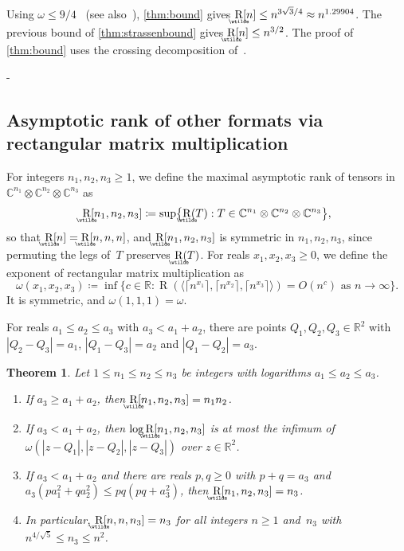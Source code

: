\documentclass[11pt,letterpaper]{article}
\makeatletter
\numberwithin{equation}{section}
\newcommand{\reservelines}[1]{\par\penalty\z@\dimen@\pagegoal\advance\dimen@-\pagetotal
 \ifdim\dimen@<#1\baselineskip\ifdim\dimen@>\z@\vfil\fi\break\fi}
\let\plainsubsection\subsection
\renewcommand{\subsection}{\reservelines{7}\plainsubsection}
\newtheorem{theorem}{Theorem}[section]
\theoremstyle{definition}
\DeclareMathOperator{\tensorrank}{R}
\DeclareMathOperator{\asymprank}{\underaccent{\wtilde}{R}}
\newcommand{\CC}{\mathbb{C}}
\newcommand{\RR}{\mathbb{R}}
\makeatother
\begin{document}
Using $\omega\le9/4$~\cite[Theorem~1.1]{OAI:Matrix-Multiplication-Nine-Fourths-October-2-2026} (see
also~\cite{amanov2026multiplyingmatricespolynomialsexposition,dogan2026tensorvalue,li2026semidirect,shpilka2026exposition}), \cref{thm:bound} gives $\asymprank[n]\le n^{3\sqrt3/4}\approx n^{1.29904}$. The previous bound of \cref{thm:strassenbound}
gives $\asymprank[n]\le n^{3/2}$. The proof of \cref{thm:bound} uses the crossing decomposition
of~\cite{claude2026threeSAT,khoruzhii2026crossing}.

\subsection{Asymptotic rank of other formats via rectangular matrix multiplication}\label{sec:intro-formats}

For integers $n_1,n_2,n_3\ge1$, we define the maximal asymptotic rank of tensors in
$\CC^{n_1}\otimes\CC^{n_2}\otimes\CC^{n_3}$ as
\[
\asymprank[n_1,n_2,n_3]\coloneqq\sup\bigl\{\asymprank(T):T\in\CC^{n_1}\otimes\CC^{n_2}\otimes\CC^{n_3}\bigr\},
\]
so that $\asymprank[n]=\asymprank[n,n,n]$, and $\asymprank[n_1,n_2,n_3]$ is symmetric in $n_1,n_2,n_3$, since permuting the legs of~$T$ preserves $\asymprank(T)$. For reals $x_1,x_2,x_3\ge0$, we define the exponent of rectangular matrix multiplication as
\[
 \omega(x_1,x_2,x_3)\coloneqq\inf\bigl\{c\in\RR:\tensorrank(\langle\lceil n^{x_1}\rceil,\lceil n^{x_2}\rceil,\lceil
 n^{x_3}\rceil\rangle)=O(n^c)\text{ as }n\to\infty\bigr\}.
\]
It is symmetric, and $\omega(1,1,1)=\omega$.

For reals $a_1\le a_2\le a_3$ with $a_3<a_1+a_2$, there are points $Q_1,Q_2,Q_3\in\RR^2$ with $|Q_2-Q_3|=a_1$,
$|Q_1-Q_3|=a_2$ and $|Q_1-Q_2|=a_3$.

\begin{theorem}\label{thm:formats}
Let $1\le n_1\le n_2\le n_3$ be integers with logarithms $a_1\le a_2\le a_3$.
\begin{enumerate}[\upshape(i)]
\item\label{it:fmt-wide} If $a_3\ge a_1+a_2$, then $\asymprank[n_1,n_2,n_3]=n_1n_2$.
\item\label{it:fmt-bound} If $a_3<a_1+a_2$, then $\log \asymprank[n_1,n_2,n_3]$ is at most the infimum of
$\omega(|z-Q_1|,|z-Q_2|,|z-Q_3|)$ over $z\in\RR^2$.
\item\label{it:fmt-exact} If $a_3<a_1+a_2$ and there are reals $p,q\ge0$ with $p+q=a_3$ and
$a_3(pa_1^2+qa_2^2)\le pq(pq+a_3^2)$, then $\asymprank[n_1,n_2,n_3]=n_3$.
\item\label{it:fmt-square} In particular, $\asymprank[n,n,n_3]=n_3$ for all integers $n\ge1$ and~$n_3$ with $n^{4/\sqrt5}\le
n_3\le n^2$.
\end{enumerate}
\end{theorem}
\end{document}
